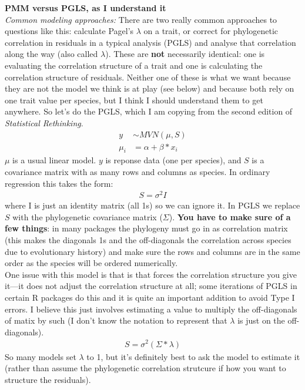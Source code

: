 \documentclass[11pt,letter]{article}
\begin{document}

\renewcommand{\refname}{\CHead{}}

{\bf PMM versus PGLS, as I understand it}\\

\emph{Common modeling approaches:} There are two really common approaches to questions like this: calculate Pagel's $\lambda$ on a trait, or correct for phylogenetic correlation in residuals in a typical analysis (PGLS) and analyse that correlation along the way (also called $\lambda$). These are {\bf not} necessarily identical: one is evaluating the correlation structure of a trait and one is calculating the correlation structure of residuals. Neither one of these is what we want because they are not the model we think is at play (see below) and because both rely on one trait value per species, but I think I should understand them to get anywhere. So let's do the PGLS, which I am copying from the second edition of \emph{Statistical Rethinking}.\\

\begin{align}
y & \sim MVN(\mu, S)\\
\mu_i & = \alpha +  \beta*x_i
\end{align}
$\mu$ is a usual linear model. $y$ is reponse data (one per species), and $S$ is a covariance matrix with as many rows and columns as species. In ordinary regression this takes the form:
\begin{align}
S = \sigma^2I
\end{align}
where I is just an identity matrix (all 1s) so we can ignore it. In PGLS we replace $S$ with the phylogenetic covariance matrix ($\Sigma$). {\bf You have to make sure of a few things}: in many packages the phylogeny must go in as correlation matrix (this makes the diagonals 1s and the off-diagonals the correlation across species due to evolutionary history) and make sure the rows and columns are in the same order as the species will be ordered numerically.\\ 

One issue with this model is that is that forces the correlation structure you give it---it does not adjust the correlation structure at all; some iterations of PGLS in certain R packages do this and it is quite an important addition to avoid Type I errors. I believe this just involves estimating a value to multiply the off-diagonals of matix by such (I don't know the notation to represent that $\lambda$ is just on the off-diagonals).
\begin{align}
S = \sigma^2(\Sigma*\lambda)
\end{align}
So many models set $\lambda$ to 1, but it's definitely best to ask the model to estimate it (rather than assume the phylogenetic correlation strutcure if how you want to structure the residuals). \\
\end{document}
